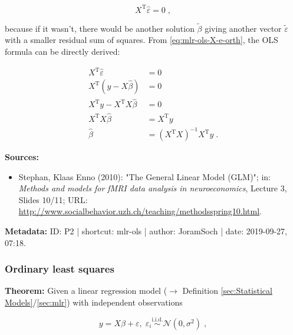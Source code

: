 \documentclass[a4paper,12pt,twoside]{book}
\begin{document}
\begin{equation} \label{eq:mlr-ols-X-e-orth}
X^\mathrm{T} \hat{\varepsilon} = 0 \; ,
\end{equation}

because if it wasn't, there would be another solution $\tilde{\beta}$ giving another vector $\tilde{\varepsilon}$ with a smaller residual sum of squares. From \eqref{eq:mlr-ols-X-e-orth}, the OLS formula can be directly derived:

\begin{equation} \label{eq:mlr-ols-OLS-qed}
\begin{split}
X^\mathrm{T} \hat{\varepsilon} &= 0 \\
X^\mathrm{T} \left( y - X\hat{\beta} \right) &= 0 \\
X^\mathrm{T} y - X^\mathrm{T} X\hat{\beta} &= 0 \\
X^\mathrm{T} X\hat{\beta} &= X^\mathrm{T} y \\
\hat{\beta} &= (X^\mathrm{T} X)^{-1} X^\mathrm{T} y \; .
\end{split}
\end{equation}


\vspace{1em}
\textbf{Sources:}
\begin{itemize}
\item Stephan, Klaas Enno (2010): "The General Linear Model (GLM)"; in: \textit{Methods and models for fMRI data analysis in neuroeconomics}, Lecture 3, Slides 10/11; URL: \url{http://www.socialbehavior.uzh.ch/teaching/methodsspring10.html}.
\end{itemize}


\vspace{1em}
\textbf{Metadata:} ID: P2 | shortcut: mlr-ols | author: JoramSoch | date: 2019-09-27, 07:18.
\vspace{1em}



\subsubsection[\textbf{Ordinary least squares}]{Ordinary least squares} \label{sec:mlr-ols2}
\setcounter{equation}{0}

\textbf{Theorem:} Given a linear regression model ($\rightarrow$ Definition \ref{sec:Statistical Models}/\ref{sec:mlr}) with independent observations

\begin{equation} \label{eq:mlr-ols2-MLR}
y = X\beta + \varepsilon, \; \varepsilon_i \overset{\mathrm{i.i.d.}}{\sim} \mathcal{N}(0, \sigma^2) \; ,
\end{equation}
\end{document}
